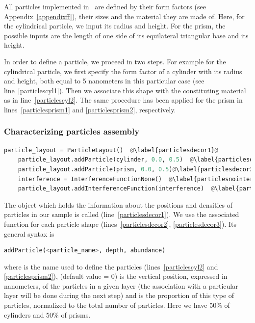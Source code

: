 All particles implemented in \BornAgain\ are defined by their
form factors (see Appendix~\ref{appendixff}), their sizes and the material
they are made of. Here, for the
cylindrical particle, we input its radius and height.  For the prism, 
the possible inputs are the length of one side of its equilateral triangular
base and its height.

In order to define a particle, we proceed in two steps. For example for
the cylindrical particle, we first specify the form factor of a cylinder with 
its radius and height, both equal to 5 nanometers in this particular
case (see line~\ref{particlescyl1}). Then we associate this shape with
the constituting material as in line~\ref{particlescyl2}.
The same procedure has been applied for the prism in lines~\ref{particlesprism1} and \ref{particlesprism2}, respectively.


%
\subsubsection{Characterizing particles assembly} 
\begin{lstlisting}[language=python, style=eclipseboxed, name=ex1,nolol]
    particle_layout = ParticleLayout()  @\label{particlesdecor1}@
    particle_layout.addParticle(cylinder, 0.0, 0.5)  @\label{particlesdecor2}@
    particle_layout.addParticle(prism, 0.0, 0.5)@\label{particlesdecor3}@
    interference = InterferenceFunctionNone()  @\label{particlesnointerf}@
    particle_layout.addInterferenceFunction(interference)  @\label{particlesinterf}@
\end{lstlisting}
The object which holds the information about the positions and densities of particles
in our sample is called 
(line~\ref{particlesdecor1}). We use the associated function 
for each particle shape (lines~\ref{particlesdecor2}, \ref{particlesdecor3}). Its general syntax is 

\begin{lstlisting}[language=python, style=eclipse,numbers=none]
addParticle(<particle_name>, depth, abundance) 
\end{lstlisting}
where  is the name used to define the particles
(lines~\ref{particlescyl2} and \ref{particlesprism2}), 
(default value = 0)
is the vertical position, expressed in nanometers, of the particles in a given layer (the
association with a particular layer will be done during the next step) and
 is the proportion of this type of particles, 
normalized to the total number of particles. Here we have 50\% of cylinders
and 50\% of prisms.

